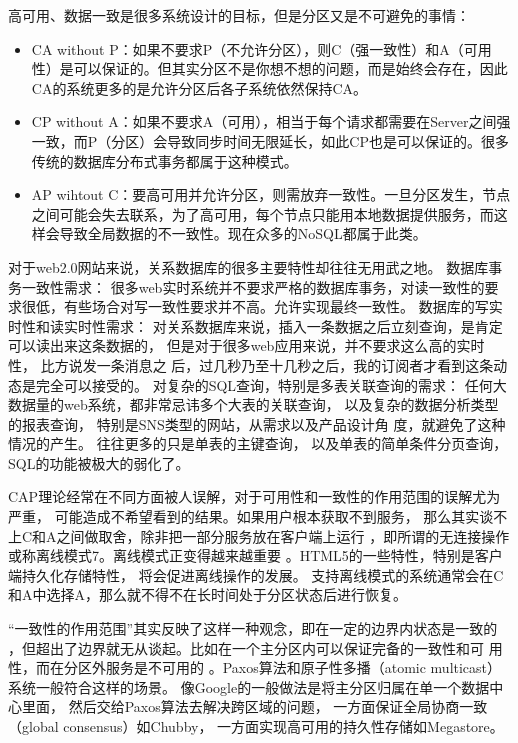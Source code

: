 高可用、数据一致是很多系统设计的目标，但是分区又是不可避免的事情：
\begin{itemize}
	\item CA without P：如果不要求P（不允许分区），则C（强一致性）和A（可用性）是可以保证的。但其实分区不是你想不想的问题，而是始终会存在，因此CA的系统更多的是允许分区后各子系统依然保持CA。
\item 	CP without A：如果不要求A（可用），相当于每个请求都需要在Server之间强一致，而P（分区）会导致同步时间无限延长，如此CP也是可以保证的。很多传统的数据库分布式事务都属于这种模式。
\item 	AP wihtout C：要高可用并允许分区，则需放弃一致性。一旦分区发生，节点之间可能会失去联系，为了高可用，每个节点只能用本地数据提供服务，而这样会导致全局数据的不一致性。现在众多的NoSQL都属于此类。
\end{itemize}

对于web2.0网站来说，关系数据库的很多主要特性却往往无用武之地。
数据库事务一致性需求：
很多web实时系统并不要求严格的数据库事务，对读一致性的要求很低，有些场合对写一致性要求并不高。允许实现最终一致性。
数据库的写实时性和读实时性需求：
对关系数据库来说，插入一条数据之后立刻查询，是肯定可以读出来这条数据的，
但是对于很多web应用来说，并不要求这么高的实时性，
比方说发一条消息之 后，过几秒乃至十几秒之后，我的订阅者才看到这条动态是完全可以接受的。
对复杂的SQL查询，特别是多表关联查询的需求：
任何大数据量的web系统，都非常忌讳多个大表的关联查询，
以及复杂的数据分析类型的报表查询，
特别是SNS类型的网站，从需求以及产品设计角 度，就避免了这种情况的产生。
往往更多的只是单表的主键查询，
以及单表的简单条件分页查询，SQL的功能被极大的弱化了。       


CAP理论经常在不同方面被人误解，对于可用性和一致性的作用范围的误解尤为严重，
可能造成不希望看到的结果。如果用户根本获取不到服务，
那么其实谈不上C和A之间做取舍，除非把一部分服务放在客户端上运行
，即所谓的无连接操作或称离线模式7。离线模式正变得越来越重要
。HTML5的一些特性，特别是客户端持久化存储特性，
将会促进离线操作的发展。
支持离线模式的系统通常会在C和A中选择A，那么就不得不在长时间处于分区状态后进行恢复。

“一致性的作用范围”其实反映了这样一种观念，即在一定的边界内状态是一致的
，但超出了边界就无从谈起。比如在一个主分区内可以保证完备的一致性和可
用性，而在分区外服务是不可用的
。Paxos算法和原子性多播（atomic multicast）系统一般符合这样的场景。
像Google的一般做法是将主分区归属在单一个数据中心里面，
然后交给Paxos算法去解决跨区域的问题，
一方面保证全局协商一致（global consensus）如Chubby，
一方面实现高可用的持久性存储如Megastore。

